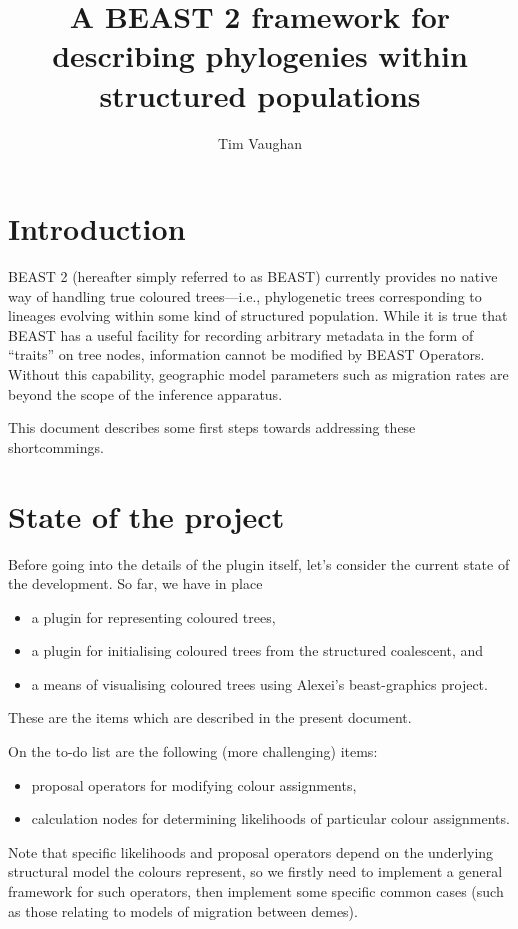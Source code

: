 \documentclass[a4paper,11pt]{paper}
\title{A BEAST 2 framework for describing phylogenies within
structured populations}
\author{Tim Vaughan}
\newcommand{\project}[1]{\textsf{#1}}
\begin{document}
\maketitle

\section{Introduction}

BEAST 2 (hereafter simply referred to as BEAST) currently provides no
native way of handling true coloured trees---i.e., phylogenetic trees
corresponding to lineages evolving within some kind of structured
population. While it is true that BEAST has a useful facility for
recording arbitrary metadata in the form of ``traits'' on tree nodes,
information cannot be modified by BEAST Operators.  Without this
capability, geographic model parameters such as migration rates are
beyond the scope of the inference apparatus.

This document describes some first steps towards addressing these
shortcommings.

\section{State of the project}
Before going into the details of the plugin itself, let's consider the
current state of the development. So far, we have in place
\begin{itemize}
	\item a plugin for representing coloured trees,
	\item a plugin for initialising coloured trees from the structured
		coalescent, and
	\item a means of visualising coloured trees using Alexei's
		\project{beast-graphics} project.
\end{itemize}
These are the items which are described in the present document.

On the to-do list are the following (more challenging) items:
\begin{itemize}
	\item proposal operators for modifying colour assignments,
	\item calculation nodes for determining likelihoods of particular
		colour assignments.
\end{itemize}
Note that specific likelihoods and proposal operators depend on the
underlying structural model the colours represent, so we firstly need
to implement a general framework for such operators, then implement
some specific common cases (such as those relating to models of
migration between demes).
\end{document}
